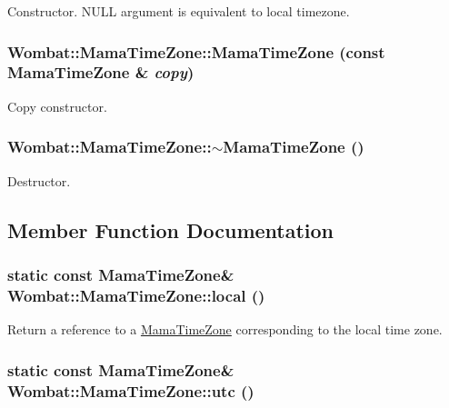Constructor. NULL argument is equivalent to local timezone. \hypertarget{classWombat_1_1MamaTimeZone_ad13aa55fee7c8a5a2054e0d961a6db22}{
\subsubsection[{MamaTimeZone}]{\setlength{\rightskip}{0pt plus 5cm}Wombat::MamaTimeZone::MamaTimeZone (const {\bf MamaTimeZone} \& {\em copy})}}
\label{classWombat_1_1MamaTimeZone_ad13aa55fee7c8a5a2054e0d961a6db22}


Copy constructor. \hypertarget{classWombat_1_1MamaTimeZone_a0ae3e20777724ed1b27eeda695eee728}{
\subsubsection[{$\sim$MamaTimeZone}]{\setlength{\rightskip}{0pt plus 5cm}Wombat::MamaTimeZone::$\sim$MamaTimeZone ()}}
\label{classWombat_1_1MamaTimeZone_a0ae3e20777724ed1b27eeda695eee728}


Destructor. 

\subsection{Member Function Documentation}
\hypertarget{classWombat_1_1MamaTimeZone_ae0e145bc9434a5c7ab3028be41327bb3}{
\subsubsection[{local}]{\setlength{\rightskip}{0pt plus 5cm}static const {\bf MamaTimeZone}\& Wombat::MamaTimeZone::local ()}}
\label{classWombat_1_1MamaTimeZone_ae0e145bc9434a5c7ab3028be41327bb3}


Return a reference to a \hyperlink{classWombat_1_1MamaTimeZone}{MamaTimeZone} corresponding to the local time zone. \hypertarget{classWombat_1_1MamaTimeZone_a98528db714ffcb96f44c25ea2d41ca3a}{
\subsubsection[{utc}]{\setlength{\rightskip}{0pt plus 5cm}static const {\bf MamaTimeZone}\& Wombat::MamaTimeZone::utc ()}}
\label{classWombat_1_1MamaTimeZone_a98528db714ffcb96f44c25ea2d41ca3a}


